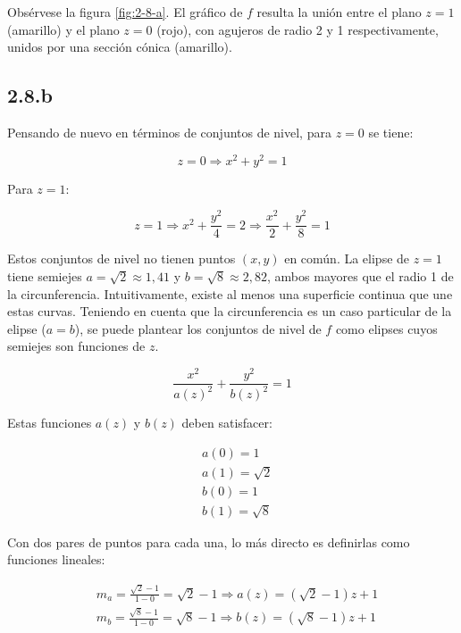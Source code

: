 \documentclass{article}
\begin{document}
Obsérvese la figura \ref{fig:2-8-a}. El gráfico de $f$ resulta la unión entre el plano $z=1$ (amarillo) y el plano $z=0$ (rojo), con agujeros de radio 2 y 1 respectivamente, unidos por una sección cónica (amarillo).

\subsection*{2.8.b}
\label{subsec:2.8.b}

Pensando de nuevo en términos de conjuntos de nivel, para $z = 0$ se tiene:

\begin{equation}
z = 0 \Rightarrow x^2 + y^2 = 1
\end{equation}

Para $z = 1$:

\begin{equation}
z = 1 \Rightarrow x^2 + \frac{y^2}{4} = 2 \Rightarrow \frac{x^2}{2} + \frac{y^2}{8} = 1
\end{equation}

Estos conjuntos de nivel no tienen puntos $(x,y)$ en común. La elipse de $z=1$ tiene semiejes $a = \sqrt{2} \approx 1,41$ y $b = \sqrt{8} \approx 2,82$, ambos mayores que el radio 1 de la circunferencia. Intuitivamente, existe al menos una superficie continua que une estas curvas. Teniendo en cuenta que la circunferencia es un caso particular de la elipse ($a=b$), se puede plantear los conjuntos de nivel de $f$ como elipses cuyos semiejes son funciones de $z$. 

\begin{equation}
\frac{x^2}{a(z)^2} + \frac{y^2}{b(z)^2} = 1
\end{equation}

Estas funciones $a(z)$ y $b(z)$ deben satisfacer:

\begin{subequations}
\begin{align}
& a(0) = 1 \\
& a(1) = \sqrt{2} \\
& b(0) = 1 \\
& b(1) = \sqrt{8}
\end{align}
\end{subequations}

Con dos pares de puntos para cada una, lo más directo es definirlas como funciones lineales:

\begin{subequations}
\begin{align}
& m_a = \frac{\sqrt{2}-1}{1-0} = \sqrt{2} - 1 \Rightarrow a(z) = (\sqrt{2}-1) z + 1 \\
& m_b = \frac{\sqrt{8}-1}{1-0} = \sqrt{8} - 1 \Rightarrow b(z) = (\sqrt{8}-1) z + 1
\end{align}
\end{subequations}
\end{document}
